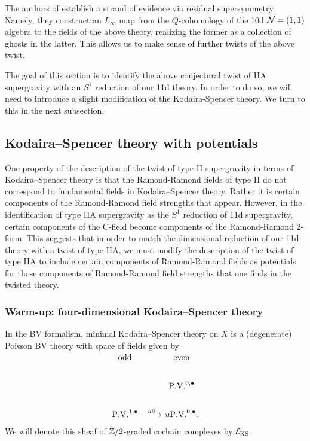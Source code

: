 \documentclass[11pt]{amsart}
\begin{document}
The authors of \cite{} establish a strand of evidence via residual supersymmetry. Namely, they construct an $L_{\infty}$ map from the $Q$-cohomology of the 10d $\mathcal N = (1,1)$ algebra to the fields of the above theory, realizing the former as a collection of ghosts in the latter. This allows us to make sense of further twists of the above twist.

The goal of this section is to identify the above conjectural twist of IIA supergravity with an $S^{1}$ reduction of our 11d theory. In order to do so, we will need to introduce a slight modification of the Kodaira-Spencer theory. We turn to this in the next subsection.

\subsection{Kodaira--Spencer theory with potentials}
\label{KSPot}

One property of the description of the twist of type II supergravity in terms of Kodaira--Spencer theory is that the Ramond-Ramond fields of type II do not correspond to fundamental fields in Kodaira--Spencer theory. Rather it is certain components of the Ramond-Ramond field strengths that appear. However, in the identification of type IIA supergravity as the $S^{1}$ reduction of 11d supergravity, certain components of the C-field become components of the Ramond-Ramond 2-form. This suggests that in order to match the dimensional reduction of our 11d theory with a twist of type IIA, we must modify the description of the twist of type IIA to include certain components of Ramond-Ramond fields as potentials for those components of Ramond-Ramond field strengths that one finds in the twisted theory.

\subsubsection{Warm-up: four-dimensional Kodaira--Spencer theory}
\label{sec:org91dc4ca}
In the BV formalism, minimal Kodaira--Spencer theory on $X$ is a (degenerate) Poisson BV theory with space of fields given by
\[
\begin{tikzcd}
\ul{\rm odd} & \ul{\rm even} \\
 & \PV^{0,\bu} \\
 \PV^{1,\bu} \ar[r, "u \partial"] & u \PV^{0,\bu} .
\end{tikzcd}
\]
We will denote this sheaf of $\mathbb Z /2$-graded cochain complexes by $\mathcal E_{\rm KS}$.
\end{document}
